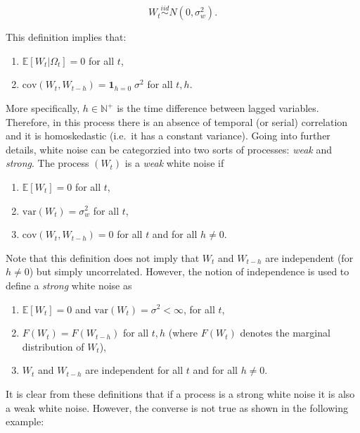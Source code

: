 \documentclass[]{book}
\providecommand{\tightlist}{%
  \setlength{\itemsep}{0pt}\setlength{\parskip}{0pt}}
\theoremstyle{definition}
\theoremstyle{definition}
\theoremstyle{definition}
\theoremstyle{remark}
\begin{document}
\[{W_t}\mathop \sim \limits^{iid} N\left( {0,\sigma _w^2} \right).\]

This definition implies that:

\begin{enumerate}
\def\labelenumi{\arabic{enumi}.}
\tightlist
\item
  \(\mathbb{E}[W_t | \Omega_t] = 0\) for all \(t\),
\item
  \(\text{cov}\left(W_t, W_{t-h} \right) = \boldsymbol{1}_{h = 0} \; \sigma^2\)
  for all \(t, h\).
\end{enumerate}

More specifically, \(h \in \mathbb{N}^+\) is the time difference between
lagged variables. Therefore, in this process there is an absence of
temporal (or serial) correlation and it is homoskedastic (i.e.~it has a
constant variance). Going into further details, white noise can be
categorzied into two sorts of processes: \emph{weak} and \emph{strong}.
The process \((W_t)\) is a \emph{weak} white noise if

\begin{enumerate}
\def\labelenumi{\arabic{enumi}.}
\tightlist
\item
  \(\mathbb{E}[W_t] = 0\) for all \(t\),
\item
  \(\text{var}\left(W_t\right) = \sigma_w^2\) for all \(t\),
\item
  \(\text{cov} \left(W_t, W_{t-h}\right) = 0\) for all \(t\) and for all
  \(h \neq 0\).
\end{enumerate}

Note that this definition does not imply that \(W_t\) and \(W_{t-h}\)
are independent (for \(h \neq 0\)) but simply uncorrelated. However, the
notion of independence is used to define a \emph{strong} white noise as

\begin{enumerate}
\def\labelenumi{\arabic{enumi}.}
\tightlist
\item
  \(\mathbb{E}[W_t] = 0\) and \(\text{var}(W_t) = \sigma^2 < \infty\),
  for all \(t\),
\item
  \(F(W_t) = F(W_{t-h})\) for all \(t,h\) (where \(F(W_t)\) denotes the
  marginal distribution of \(W_t\)),
\item
  \(W_t\) and \(W_{t-h}\) are independent for all \(t\) and for all
  \(h \neq 0\).
\end{enumerate}

It is clear from these definitions that if a process is a strong white
noise it is also a weak white noise. However, the converse is not true
as shown in the following example:
\end{document}
